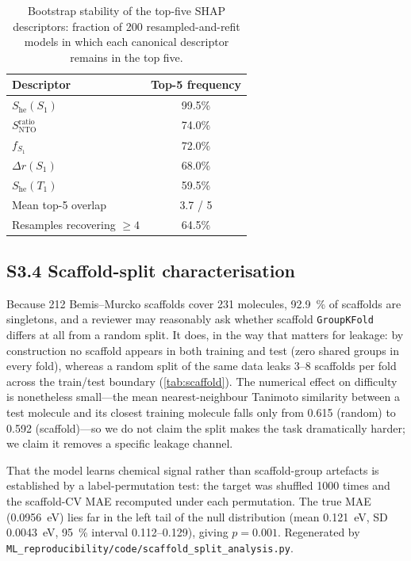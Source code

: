 \documentclass[twoside,twocolumn,9pt]{extarticle}
\begin{document}
\begin{table}[htbp]
  \centering
  \caption{Bootstrap stability of the top-five SHAP descriptors: fraction of
    \num{200} resampled-and-refit models in which each canonical descriptor remains
    in the top five.}
  \label{tab:shapboot}
  \footnotesize
  \begin{tabular}{lc}
    \toprule
    Descriptor & Top-5 frequency \\
    \midrule
    $S_\text{he}(S_1)$            & 99.5\% \\
    $S_\text{NTO}^{\text{ratio}}$ & 74.0\% \\
    $f_{S_1}$                     & 72.0\% \\
    $\Delta r(S_1)$               & 68.0\% \\
    $S_\text{he}(T_1)$            & 59.5\% \\
    \midrule
    Mean top-5 overlap            & 3.7 / 5 \\
    Resamples recovering $\ge 4$  & 64.5\% \\
    \bottomrule
  \end{tabular}
\end{table}

\subsection*{S3.4 Scaffold-split characterisation}
Because \num{212} Bemis--Murcko scaffolds cover \num{231} molecules,
\qty{92.9}{\percent} of scaffolds are singletons, and a reviewer may reasonably ask
whether scaffold \texttt{GroupKFold} differs at all from a random split. It does, in
the way that matters for leakage: by construction no scaffold appears in both
training and test (zero shared groups in every fold), whereas a random split of the
same data leaks \numrange{3}{8} scaffolds per fold across the train/test boundary
(\cref{tab:scaffold}). The numerical effect on difficulty is nonetheless small---the
mean nearest-neighbour Tanimoto similarity between a test molecule and its closest
training molecule falls only from \num{0.615} (random) to \num{0.592} (scaffold)---so
we do not claim the split makes the task dramatically harder; we claim it removes a
specific leakage channel.

That the model learns chemical signal rather than scaffold-group artefacts is
established by a label-permutation test: the target was shuffled \num{1000} times and
the scaffold-CV MAE recomputed under each permutation. The true MAE
(\qty{0.0956}{\electronvolt}) lies far in the left tail of the null distribution
(mean \qty{0.121}{\electronvolt}, SD \qty{0.0043}{\electronvolt}, \qty{95}{\percent}
interval \numrange{0.112}{0.129}), giving $p = 0.001$. Regenerated by
\texttt{ML\_reproducibility/code/scaffold\_split\_analysis.py}.
\end{document}
